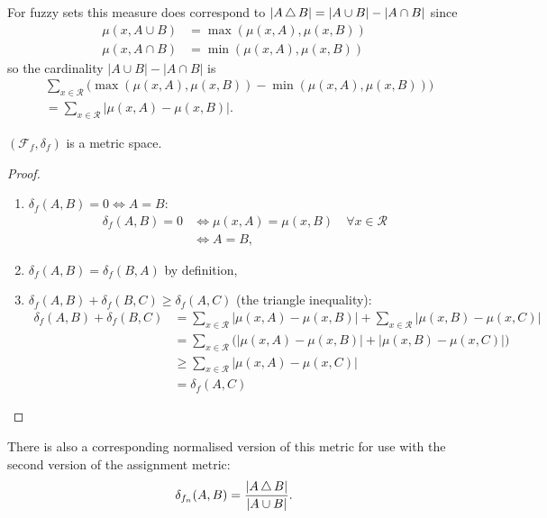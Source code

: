 For fuzzy sets this measure does correspond to $|A \operatorname{\bigtriangleup} B| = |A \cup B|
- |A \cap B|$ since
\begin{align*}
  \mu(x, A \cup B) &= \max(\mu(x,A), \mu(x,B))\\
  \mu(x, A \cap B) &= \min(\mu(x,A), \mu(x,B))
\end{align*}
so the cardinality $|A \cup B| - |A \cap B|$ is
\begin{align*}
  &\sum_{x \in \mathcal{R}} \big(\max(\mu(x,A),\mu(x,B)) - \min(\mu(x,A),\mu(x,B))\big)\\
  &= \sum_{x \in \mathcal{R}} |\mu(x,A) - \mu(x,B)|.
\end{align*}

\begin{thm}
  $(\mathcal{F}_f, \delta_f)$ is a metric space.
\end{thm}

\begin{proof}~
  
  \begin{enumerate}
  \item $\delta_f(A,B) = 0 \iff A=B$:
    \begin{align*}
      \delta_f(A,B) = 0 &\iff \mu(x,A) = \mu(x,B) \quad \forall x \in
      \mathcal{R}\\
      &\iff A = B,
    \end{align*}
  \item $\delta_f(A,B) = \delta_f(B,A)$ by definition,
  \item $\delta_f(A,B)+\delta_f(B,C) \geq \delta_f(A,C)$ (the triangle
    inequality):
    \begin{align*}
      \delta_f(A,B) + \delta_f(B,C)
      &= \sum_{x \in \mathcal{R}} |\mu(x,A) - \mu(x,B)|
      + \sum_{x \in \mathcal{R}} |\mu(x,B) - \mu(x,C)|\\
      &= \sum_{x \in \mathcal{R}} \big(|\mu(x,A)-\mu(x,B)|
      + |\mu(x,B)-\mu(x,C)|\big)\\
      &\geq \sum_{x \in \mathcal{R}} |\mu(x,A) - \mu(x,C)|\\
      &= \delta_f(A,C)
    \end{align*}
  \end{enumerate}
\end{proof}

There is also a corresponding normalised version of this metric for use with
the second version of the assignment metric:
  \begin{equation*}
    \delta_{f_n}(A,B) = \frac{|A \operatorname{\bigtriangleup} B|}{|A \cup B|}.
  \end{equation*}

